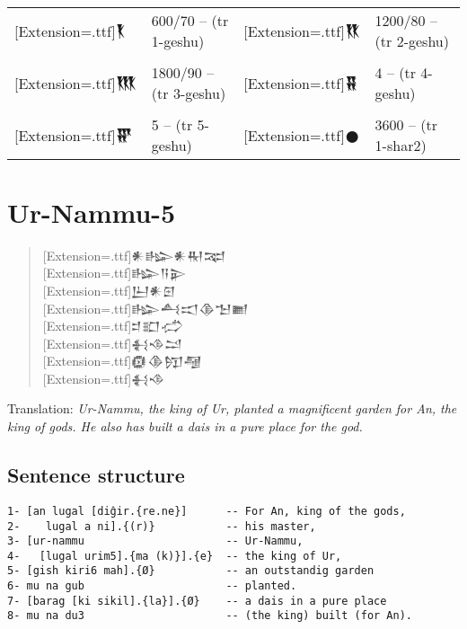 \documentclass[a4paper,12pt]{book}
\newcommand{\fcm}{\large\setmainfont{Akkadian}[Extension=.ttf]}
\newcommand{\fsm}{\Large\setmainfont{Akkadian}[Extension=.ttf]}
\begin{document}
\verb||\\
\begin{tabular}[!h]{l l | l l|}
  {\fcm 𒐞}      & 600/70 -- (tr 1-geshu)
  & {\fcm 𒐟}     & 1200/80 -- (tr 2-geshu)\\
 &&&\\
 {\fcm 𒐠}      &  1800/90 -- (tr 3-geshu) 
 & {\fcm 𒐡}   & 4 -- (tr 4-geshu)\\
&&&\\
 {\fcm 𒐢}   & 5 -- (tr 5-geshu)
 &  {\fcm 𒊹}   &  3600 -- (tr 1-shar2)  \\
 \end{tabular}



\chapter{Ur-Nammu-5}
\begin{quotation}
{\fsm 𒀭𒈗𒀭𒊑𒉈} \\
    
{\fsm 𒈗𒀀𒉌} \\

{\fsm 𒌨𒀭𒇉} \\

{\fsm 𒈗𒋀𒀊𒆠𒈠𒆤} \\

{\fsm 𒄑𒊬𒈤} \\

{\fsm 𒈬𒈾𒁺} \\

{\fsm 𒁈𒆠𒂖𒆷} \\

{\fsm 𒈬𒈾} 
\end{quotation}
Translation:
{\em Ur-Nammu, the king of Ur, planted a magnificent
  garden for An, the king of gods. He also has built
  a dais in a pure place for the god.}

\newpage
\section{Sentence structure}
\begin{verbatim}
1- [an lugal [diĝir.{re.ne}]      -- For An, king of the gods,
2-    lugal a ni].{(r)}           -- his master,
3- [ur-nammu                      -- Ur-Nammu,
4-   [lugal urim5].{ma (k)}].{e}  -- the king of Ur,
5- [gish kiri6 mah].{Ø}           -- an outstandig garden
6- mu na gub                      -- planted.
7- [barag [ki sikil].{la}].{Ø}    -- a dais in a pure place
8- mu na du3                      -- (the king) built (for An).
\end{verbatim}
\end{document}
